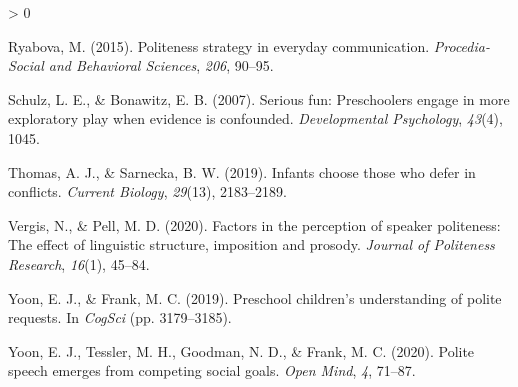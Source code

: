 \documentclass[
  english,
  man,floatsintext]{apa6}
\newlength{\cslhangindent}
\newenvironment{CSLReferences}[2] %
 {%
  \setlength{\parindent}{0pt}
  \ifodd #1 \everypar{\setlength{\hangindent}{\cslhangindent}}\ignorespaces\fi
  \ifnum #2 > 0
  \setlength{\parskip}{#2\baselineskip}
  \fi
 }%
 {}
\begin{document}
\begin{CSLReferences}{1}{0}
\leavevmode\hypertarget{ref-ryabova2015}{}%
Ryabova, M. (2015). Politeness strategy in everyday communication. \emph{Procedia-Social and Behavioral Sciences}, \emph{206}, 90--95.

\leavevmode\hypertarget{ref-schulz2007}{}%
Schulz, L. E., \& Bonawitz, E. B. (2007). Serious fun: Preschoolers engage in more exploratory play when evidence is confounded. \emph{Developmental Psychology}, \emph{43}(4), 1045.

\leavevmode\hypertarget{ref-thomas2019}{}%
Thomas, A. J., \& Sarnecka, B. W. (2019). Infants choose those who defer in conflicts. \emph{Current Biology}, \emph{29}(13), 2183--2189.

\leavevmode\hypertarget{ref-vergis2020}{}%
Vergis, N., \& Pell, M. D. (2020). Factors in the perception of speaker politeness: The effect of linguistic structure, imposition and prosody. \emph{Journal of Politeness Research}, \emph{16}(1), 45--84.

\leavevmode\hypertarget{ref-yoon2019}{}%
Yoon, E. J., \& Frank, M. C. (2019). Preschool children's understanding of polite requests. In \emph{CogSci} (pp. 3179--3185).

\leavevmode\hypertarget{ref-yoon2020}{}%
Yoon, E. J., Tessler, M. H., Goodman, N. D., \& Frank, M. C. (2020). Polite speech emerges from competing social goals. \emph{Open Mind}, \emph{4}, 71--87.

\end{CSLReferences}

\endgroup
\end{document}
